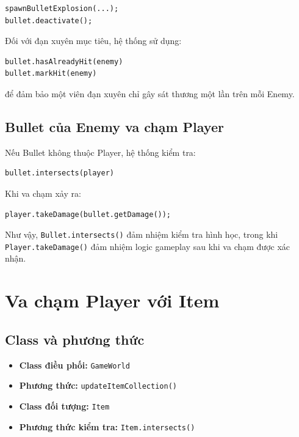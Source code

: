 \documentclass[12pt,a4paper]{report}
\begin{document}
    \begin{verbatim}
spawnBulletExplosion(...);
bullet.deactivate();
    \end{verbatim}

    Đối với đạn xuyên mục tiêu, hệ thống sử dụng:

    \begin{verbatim}
bullet.hasAlreadyHit(enemy)
bullet.markHit(enemy)
    \end{verbatim}

    để đảm bảo một viên đạn xuyên chỉ gây sát thương một lần trên
    mỗi Enemy.



    \subsection{Bullet của Enemy va chạm Player}

    Nếu Bullet không thuộc Player, hệ thống kiểm tra:

    \begin{verbatim}
bullet.intersects(player)
    \end{verbatim}

    Khi va chạm xảy ra:

    \begin{verbatim}
player.takeDamage(bullet.getDamage());
    \end{verbatim}

    Như vậy, \texttt{Bullet.intersects()} đảm nhiệm kiểm tra hình học,
    trong khi \texttt{Player.takeDamage()} đảm nhiệm logic gameplay
    sau khi va chạm được xác nhận.




    \section{Va chạm Player với Item}

    \subsection{Class và phương thức}

    \begin{itemize}
        \item \textbf{Class điều phối:} \texttt{GameWorld}
        \item \textbf{Phương thức:} \texttt{updateItemCollection()}
        \item \textbf{Class đối tượng:} \texttt{Item}
        \item \textbf{Phương thức kiểm tra:} \texttt{Item.intersects()}
    \end{itemize}
\end{document}

